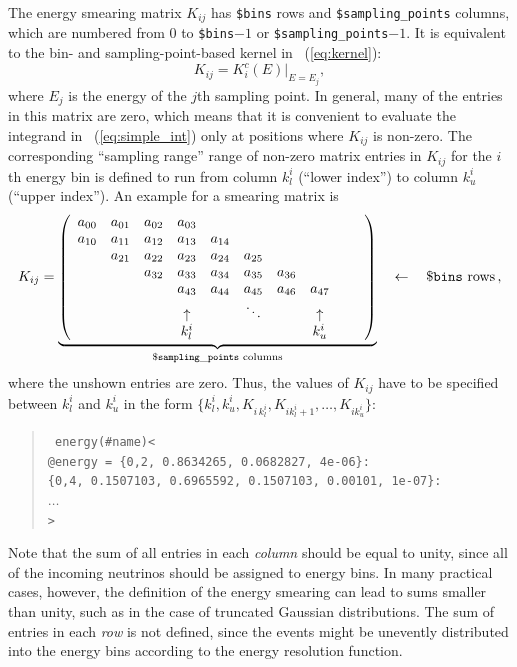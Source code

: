 The energy smearing matrix $K_{ij}$ has {\tt \$bins} rows and {\tt \$sampling\_points} columns, which are numbered from $0$ to {\tt \$bins}$-1$ or {\tt \$sampling\_points}$-1$. It is equivalent to the 
bin- and sampling-point-based kernel in \eq~(\ref{eq:kernel}):
\begin{equation}
K_{ij} = K_i^c(E) |_{E=E_j},
\label{equ:ematrix}
\end{equation}
where $E_j$ is the energy of the $j$th sampling point. In general, many of the entries in this matrix are zero, which means that it is convenient to evaluate the integrand in \eq~(\ref{eq:simple_int}) only at positions where
$K_{ij}$ is non-zero. The corresponding ``sampling range'' range of non-zero matrix entries  in $K_{ij}$ for the $i$th energy bin is defined to run from
column $k_l^i$ (``lower index'') to column $k_u^i$ (``upper index'').
An example for a smearing matrix is
\begin{equation}
K_{ij} =   \underbrace{ \left( \begin{array}{cccccccccc} 
a_{00} & a_{01} & a_{02} & a_{03} &  &  &  &  &  & \\
a_{10} & a_{11} & a_{12} & a_{13} & a_{14} &  &  &  &  &  \\
 & a_{21} & a_{22} & a_{23} & a_{24} & a_{25} &  &  &  &  \\
 &  & a_{32} & a_{33} & a_{34} & a_{35} & a_{36} &  &  &  \\
 &  &  & a_{43} & a_{44} & a_{45} & a_{46} & a_{47} &  &  \\
& & & \uparrow  & & \ddots & & \uparrow & & \\
& & & k_l^i & & & & k_u^i & & \\ 
\end{array}\right) }_{\mathtt{\$sampling\_points}  \, \, \mathrm{columns}} \quad \leftarrow \quad \footnotesize{\mathtt{\$bins} \, \, \mathrm{rows}} \, ,
\end{equation}
where the unshown entries are zero. Thus, the values of $K_{ij}$ have to be specified between $k_l^i$ and $k_u^i$ in the form $\{ k_l^i,k_u^i, K_{i \, k_l^i}, K_{i k_l^i+1} , \hdots , K_{i k_u^i} \}$:
\begin{quote}
{\tt 
energy(\#name)<\\
\tb @energy =   \{0,2, 0.8634265, 0.0682827,     4e-06\}:\\
\tb\tb \{0,4, 0.1507103, 0.6965592, 0.1507103,   0.00101,     1e-07\}:\\
\tb\tb $\ldots$\\
>
}
\end{quote}
Note that the sum of all entries in each {\em column} should be equal 
to unity,
since all of the incoming neutrinos should be assigned to energy bins. In many practical cases, however, the definition of the energy smearing can
lead to sums smaller than unity, such as in the case of truncated Gaussian
distributions. The sum of entries in each {\em row} is not defined, since the events might be unevently distributed into the energy bins
according to the energy resolution function.

